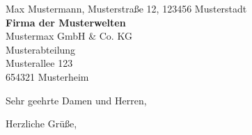 \documentclass[11pt,a4paper]{dinbrief}
\begin{document}
 

\begin{letter}{\tiny{Max Mustermann, Musterstraße 12, 123456 Musterstadt}\\
{
\textbf{Firma der Musterwelten}\\
Mustermax GmbH \& Co. KG\\
Musterabteilung\\
Musterallee 123\\
654321 Musterheim
}}

\subject{\large{\textbf{Ein treffender Betreff}} }

\opening{Sehr geehrte Damen und Herren,} 

\lipsum[1-2]

\closing{Herzliche Grüße,}

\end{letter} 
\end{document}
